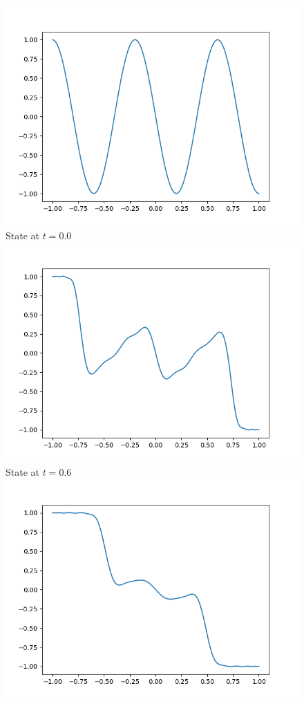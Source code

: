 \documentclass[a4paper,8pt]{article}
\begin{document}
\begin{figure}[h!]
\begin{multicols}{2}
\centering
\includegraphics[width=1\linewidth]{t0.0_plot.png}\\
State at $t=0.0$
\includegraphics[width=1\linewidth]{t0.6_plot.png}\\
State at $t=0.6$
\includegraphics[width=1\linewidth]{t1.2_plot.png}\\

\end{multicols}
\end{figure}
\end{document}

